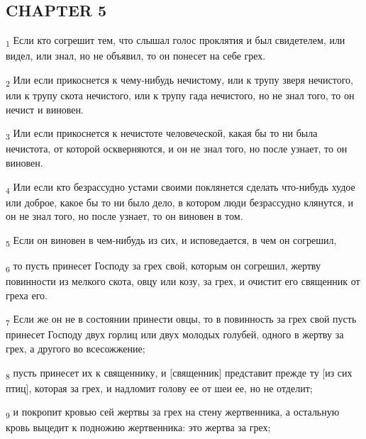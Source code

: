 \subsection{CHAPTER 5}
\begin{tcolorbox}
\textsubscript{1} Если кто согрешит тем, что слышал голос проклятия и был свидетелем, или видел, или знал, но не объявил, то он понесет на себе грех.
\end{tcolorbox}
\begin{tcolorbox}
\textsubscript{2} Или если прикоснется к чему-нибудь нечистому, или к трупу зверя нечистого, или к трупу скота нечистого, или к трупу гада нечистого, но не знал того, то он нечист и виновен.
\end{tcolorbox}
\begin{tcolorbox}
\textsubscript{3} Или если прикоснется к нечистоте человеческой, какая бы то ни была нечистота, от которой оскверняются, и он не знал того, но после узнает, то он виновен.
\end{tcolorbox}
\begin{tcolorbox}
\textsubscript{4} Или если кто безрассудно устами своими поклянется сделать что-нибудь худое или доброе, какое бы то ни было дело, в котором люди безрассудно клянутся, и он не знал того, но после узнает, то он виновен в том.
\end{tcolorbox}
\begin{tcolorbox}
\textsubscript{5} Если он виновен в чем-нибудь из сих, и исповедается, в чем он согрешил,
\end{tcolorbox}
\begin{tcolorbox}
\textsubscript{6} то пусть принесет Господу за грех свой, которым он согрешил, жертву повинности из мелкого скота, овцу или козу, за грех, и очистит его священник от греха его.
\end{tcolorbox}
\begin{tcolorbox}
\textsubscript{7} Если же он не в состоянии принести овцы, то в повинность за грех свой пусть принесет Господу двух горлиц или двух молодых голубей, одного в жертву за грех, а другого во всесожжение;
\end{tcolorbox}
\begin{tcolorbox}
\textsubscript{8} пусть принесет их к священнику, и [священник] представит прежде ту [из сих птиц], которая за грех, и надломит голову ее от шеи ее, но не отделит;
\end{tcolorbox}
\begin{tcolorbox}
\textsubscript{9} и покропит кровью сей жертвы за грех на стену жертвенника, а остальную кровь выцедит к подножию жертвенника: это жертва за грех;
\end{tcolorbox}
